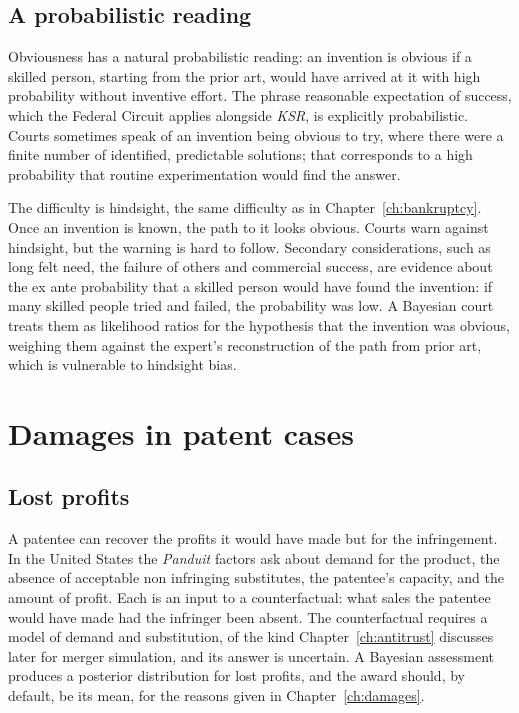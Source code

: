 \subsection{A probabilistic reading}

Obviousness has a natural probabilistic reading: an invention is obvious if a skilled person, starting from the prior art, would have arrived at it with high probability without inventive effort. The phrase reasonable expectation of success, which the Federal Circuit applies alongside \emph{KSR}, is explicitly probabilistic. Courts sometimes speak of an invention being obvious to try, where there were a finite number of identified, predictable solutions; that corresponds to a high probability that routine experimentation would find the answer.

The difficulty is hindsight, the same difficulty as in Chapter~\ref{ch:bankruptcy}. Once an invention is known, the path to it looks obvious. Courts warn against hindsight, but the warning is hard to follow. Secondary considerations, such as long felt need, the failure of others and commercial success, are evidence about the ex ante probability that a skilled person would have found the invention: if many skilled people tried and failed, the probability was low. A Bayesian court treats them as likelihood ratios for the hypothesis that the invention was obvious, weighing them against the expert's reconstruction of the path from prior art, which is vulnerable to hindsight bias.

\section{Damages in patent cases}

\subsection{Lost profits}

A patentee can recover the profits it would have made but for the infringement. In the United States the \emph{Panduit} factors ask about demand for the product, the absence of acceptable non infringing substitutes, the patentee's capacity, and the amount of profit. Each is an input to a counterfactual: what sales the patentee would have made had the infringer been absent. The counterfactual requires a model of demand and substitution, of the kind Chapter~\ref{ch:antitrust} discusses later for merger simulation, and its answer is uncertain. A Bayesian assessment produces a posterior distribution for lost profits, and the award should, by default, be its mean, for the reasons given in Chapter~\ref{ch:damages}.

